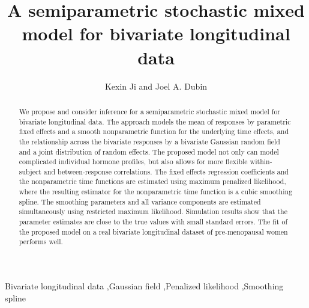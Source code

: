 \documentclass[review]{elsarticle}
\begin{document}
\begin{frontmatter}

\title{A semiparametric stochastic  mixed model for bivariate longitudinal data}


\author{Kexin Ji
and Joel A. Dubin
}
\address{Department of Statistics and Actuarial Science, University of Waterloo, 200 University Ave. W. Waterloo, Ontario N2L 3G1, Canada \\ 
kji@uwaterloo.ca, \ jdubin@uwaterloo.ca }




\begin{abstract}
We propose and consider inference for a semiparametric stochastic mixed model for bivariate longitudinal data. The approach models the mean of responses by parametric fixed effects and a smooth nonparametric function for the underlying time effects, and the relationship across the bivariate responses by a bivariate Gaussian random field and a joint distribution of random effects. 
The proposed model not only can model complicated individual hormone profiles, but also allows for more flexible within-subject and between-response correlations. 
The fixed effects regression coefficients and the nonparametric time functions are estimated using maximum penalized likelihood, where the resulting estimator for the nonparametric time function is a cubic smoothing spline. The smoothing parameters and all variance components are estimated simultaneously using restricted maximum likelihood.  Simulation results show that the parameter estimates are close to the true values with small standard errors. The fit of the proposed model on a real bivariate longitudinal dataset of pre-menopausal women performs well.
\end{abstract}

\begin{keyword}
Bivariate longitudinal data \sep Gaussian field \sep Penalized likelihood \sep Smoothing spline
\end{keyword}

\end{frontmatter}
\end{document}
